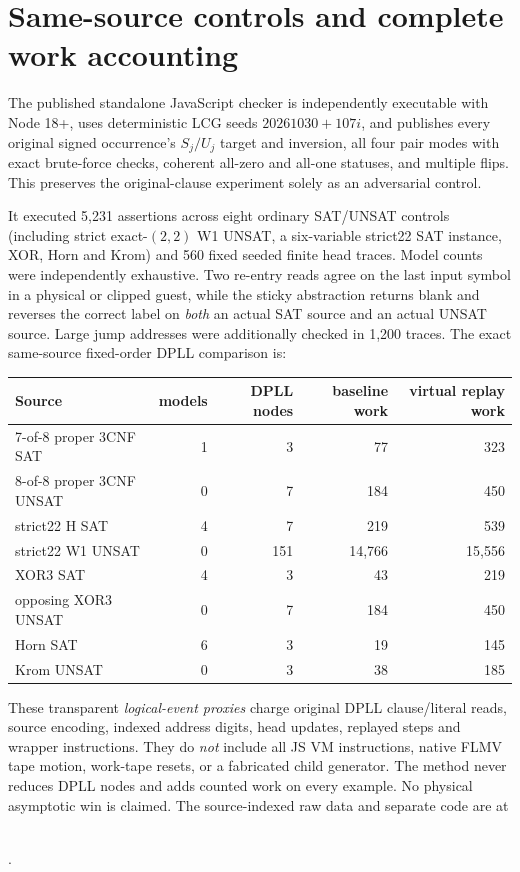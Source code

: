 \documentclass[11pt]{article}
\begin{document}
\section{Same-source controls and complete work accounting}
The published standalone JavaScript checker is independently executable with Node 18+, uses deterministic LCG seeds $20261030+107i$, and publishes every original signed occurrence's $S_j/U_j$ target and inversion, all four pair modes with exact brute-force checks, coherent all-zero and all-one statuses, and multiple flips. This preserves the original-clause experiment solely as an adversarial control.

It executed 5,231 assertions across eight ordinary SAT/UNSAT controls (including strict exact-$(2,2)$ W1 UNSAT, a six-variable strict22 SAT instance, XOR, Horn and Krom) and 560 fixed seeded finite head traces. Model counts were independently exhaustive. Two re-entry reads agree on the last input symbol in a physical or clipped guest, while the sticky abstraction returns blank and reverses the correct label on \emph{both} an actual SAT source and an actual UNSAT source. Large jump addresses were additionally checked in 1,200 traces. The exact same-source fixed-order DPLL comparison is:
\begin{center}\small
\begin{tabular}{lrrrr}
\toprule Source & models & DPLL nodes & baseline work & virtual replay work\\
\midrule
7-of-8 proper 3CNF SAT & 1 & 3 & 77 & 323\\
8-of-8 proper 3CNF UNSAT & 0 & 7 & 184 & 450\\
strict22 H SAT & 4 & 7 & 219 & 539\\
strict22 W1 UNSAT & 0 & 151 & 14,766 & 15,556\\
XOR3 SAT & 4 & 3 & 43 & 219\\
opposing XOR3 UNSAT & 0 & 7 & 184 & 450\\
Horn SAT & 6 & 3 & 19 & 145\\
Krom UNSAT & 0 & 3 & 38 & 185\\
\bottomrule
\end{tabular}
\end{center}
These transparent \emph{logical-event proxies} charge original DPLL clause/literal reads, source encoding, indexed address digits, head updates, replayed steps and wrapper instructions. They do \emph{not} include all JS VM instructions, native FLMV tape motion, work-tape resets, or a fabricated child generator. The method never reduces DPLL nodes and adds counted work on every example. No physical asymptotic win is claimed. The source-indexed raw data and separate code are at
\begin{center}\small
{}\\
.
\end{center}
\end{document}
